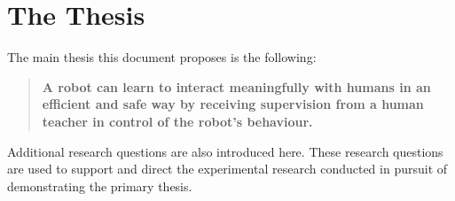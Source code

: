 
\section{The Thesis}\label{sec:intro_thesis}
The main thesis this document proposes is the following:
\begin{quote}
	\textbf{A robot can learn to interact meaningfully with humans in an efficient and safe way by receiving supervision from a human teacher in control of the robot's behaviour.}
\end{quote}

Additional research questions are also introduced here. These research questions are used to support and direct the experimental research conducted in pursuit of demonstrating the primary thesis.

